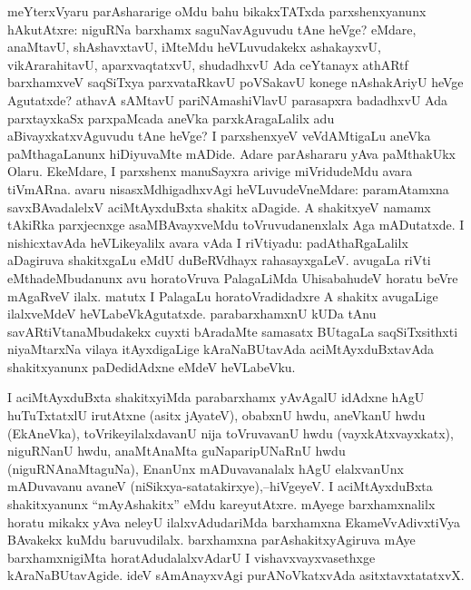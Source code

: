 meYterxVyaru parAshararige oMdu bahu bikakxTATxda parxshenxyanunx hAkutAtxre: niguRNa barxhamx saguNavAguvudu tAne heVge? eMdare, anaMtavU, shAshavxtavU, iMteMdu heVLuvudakekx ashakayxvU, vikArarahitavU, aparxvaqtatxvU, shudadhxvU Ada ceYtanayx athARtf barxhamxveV saqSiTxya parxvataRkavU poVSakavU konege nAshakAriyU heVge Agutatxde? athavA sAMtavU pariNAmashiVlavU parasapxra badadhxvU Ada parxtayxkaSx parxpaMcada aneVka parxkAragaLalilx adu aBivayxkatxvAguvudu tAne heVge? I parxshenxyeV veVdAMtigaLu aneVka paMthagaLanunx hiDiyuvaMte mADide. Adare parAshararu yAva paMthakUkx Olaru. EkeMdare, I parxshenx manuSayxra arivige miVridudeMdu avara tiVmARna. avaru nisasxMdhigadhxvAgi heVLuvudeVneMdare: paramAtamxna savxBAvadalelxV aciMtAyxduBxta shakitx aDagide. A shakitxyeV namamx tAkiRka parxjecnxge asaMBAvayxveMdu toVruvudanenxlalx Aga mADutatxde. I nishicxtavAda heVLikeyalilx avara vAda I riVtiyadu: padAthaRgaLalilx aDagiruva shakitxgaLu eMdU duBeRVdhayx rahasayxgaLeV. avugaLa riVti eMthadeMbudanunx avu horatoVruva PalagaLiMda UhisabahudeV horatu beVre mAgaRveV ilalx. matutx I PalagaLu horatoVradidadxre A shakitx avugaLige ilalxveMdeV heVLabeVkAgutatxde. parabarxhamxnU kUDa tAnu savARtiVtanaMbudakekx cuyxti bAradaMte samasatx BUtagaLa saqSiTxsithxti niyaMtarxNa vilaya itAyxdigaLige kAraNaBUtavAda aciMtAyxduBxtavAda shakitxyanunx paDedidAdxne eMdeV heVLabeVku.

I aciMtAyxduBxta shakitxyiMda parabarxhamx yAvAgalU idAdxne hAgU huTuTxtatxlU irutAtxne (asitx jAyateV), obabxnU hwdu, aneVkanU hwdu (EkAneVka), toVrike\-yilalxdavanU nija toVruvavanU hwdu (vayxkAtxvayxkatx), niguRNanU hwdu, anaMtA\-naMta guNaparipUNaRnU hwdu (niguRNAnaMtaguNa), EnanUnx mADuvavanalalx hAgU elalxvanUnx mADuvavanu avaneV (niSikxya-satatakirxye),--hiVgeyeV. I aciMtAyxduBxta shakitxyanunx ``mAyAshakitx'' eMdu kareyutAtxre. mAyege barxhamxnalilx horatu mikakx yAva neleyU ilalxvAdudariMda barxhamxna EkameVvAdivxtiVya BAvakekx kuMdu baruvudilalx. barxhamxna parAshakitxyAgiruva mAye barxhamxnigiMta horatAdudalalxvAdarU I vishavxvayxvasethxge kAraNaBUtavAgide. ideV sAmAnayxvAgi purANoVkatxvAda asitxtavxtatatxvX.

